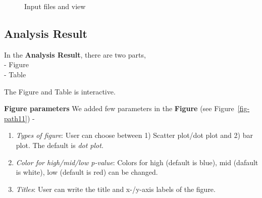 \documentclass[
  a4paper,
  DIV=11,
  numbers=noendperiod,
  oneside,
  open=any]{scrreport}
\begin{document}
\begin{figure}[H]


\caption{\label{fig-path1}Input files and view}

\end{figure}%

\subsection{Analysis Result}\label{analysis-result-4}

In the \textbf{Analysis Result}, there are two parts,\\
- Figure\\
- Table

The Figure and Table is interactive.

\textbf{Figure parameters} We added few parameters in the
\textbf{Figure} (see Figure~\ref{fig-path11}) -

\begin{enumerate}
\def\labelenumi{\arabic{enumi}.}
\item
  \emph{Types of figure}: User can choose between 1) Scatter plot/dot
  plot and 2) bar plot. The default is \emph{dot plot}.
\item
  \emph{Color for high/mid/low p-value}: Colors for high (default is
  blue), mid (dafault is white), low (default is red) can be changed.
\item
  \emph{Titles}: User can write the title and x-/y-axis labels of the
  figure.
\end{enumerate}
\end{document}

